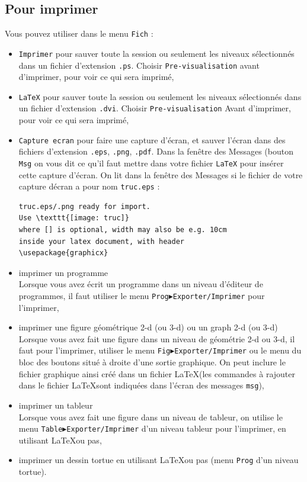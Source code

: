 \documentclass[a4paper,11pt]{article}
\begin{document}
\subsection{Pour imprimer}
Vous pouvez utiliser dans le menu {\tt Fich} :
\begin{itemize}
\item {\tt Imprimer} pour sauver toute la session ou seulement les niveaux 
s\'electionn\'es dans un fichier d'extension {\tt .ps}. Choisir 
{\tt Pre-visualisation} avant d'imprimer, pour voir ce qui sera imprim\'e, 
\item {\tt \LaTeX} pour sauver toute la session ou seulement les niveaux 
s\'electionn\'es dans un fichier d'extension {\tt .dvi}. Choisir 
{\tt Pre-visualisation}  Avant d'imprimer, pour voir ce qui sera imprim\'e,
\item {\tt Capture ecran}  pour faire une capture d'\'ecran, et sauver 
l'\'ecran dans des fichiers d'extension {\tt .eps}, {\tt .png}, {\tt .pdf}.
Dans la fen\^etre des Messages (bouton {\tt Msg} on vous dit ce qu'il faut 
mettre dans votre fichier {\tt \LaTeX} pour ins\'erer cette capture d'\'ecran.
On lit dans la fen\^etre des Messages si le fichier de votre capture d\'ecran 
a pour nom {\tt truc.eps} :
\begin{verbatim}
truc.eps/.png ready for import.
Use \texttt{[image: truc]}
where [] is optional, width may also be e.g. 10cm
inside your latex document, with header
\usepackage{graphicx}
\end{verbatim}
\item imprimer un programme\\
Lorsque vous avez \'ecrit un programme dans un niveau d'\'editeur de
 programmes, il faut utiliser le menu 
{\tt Prog$\blacktriangleright$Exporter/Imprimer}  pour l'imprimer,
\item imprimer une figure g\'eom\'etrique 2-d (ou 3-d) ou un graph 2-d (ou 3-d)\\
Lorsque vous avez fait une figure dans un niveau de g\'eom\'etrie 2-d ou 3-d, 
il faut pour l'imprimer, utiliser le menu {\tt Fig$\blacktriangleright$Exporter/Imprimer} ou le menu  du 
bloc des boutons situ\'e \`a droite d'une sortie graphique. On peut inclure 
le fichier graphique ainsi cr\'e\'e  dans un fichier \LaTeX (les 
commandes \`a rajouter dans le fichier  \LaTeX  sont indiqu\'ees dans l'\'ecran
des messages {\tt msg}),
\item imprimer un tableur\\ 
Lorsque vous avez fait une figure dans un niveau de tableur, on utilise le menu
{\tt Table$\blacktriangleright$Exporter/Imprimer} d'un niveau tableur pour 
l'imprimer, en utilisant \LaTeX ou pas,
\item imprimer un dessin tortue en utilisant \LaTeX ou pas (menu {\tt Prog} 
d'un niveau tortue).
\end{itemize}
\end{document}
